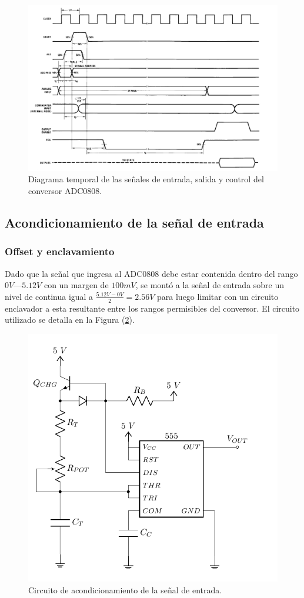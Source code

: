 \begin{figure}[H]
\centering
\includegraphics[width=0.9\linewidth]{ImagenesEjercicio1/ADC_TIMING.png}
\caption{Diagrama temporal de las señales de entrada, salida y control del conversor ADC0808.}
\label{ADC_TIMING}
\end{figure}

\subsection{Acondicionamiento de la señal de entrada}

\subsubsection{Offset y enclavamiento}

Dado que la señal que ingresa al ADC0808 debe estar contenida dentro del rango $0V$—$5.12V$ con un margen de $100mV$, se montó a la señal de entrada sobre un nivel de continua igual a $\frac{5.12V - 0V}{2} = 2.56V$ para luego limitar con un circuito enclavador a esta resultante entre los rangos permisibles del conversor. El circuito utilizado se detalla en la Figura (\ref{ACOND}).

\begin{figure}[H]
\centering
\includegraphics[width=0.6\linewidth, page = 3]{ImagenesEjercicio1/Components.pdf}
\caption{Circuito de acondicionamiento de la señal de entrada.}
\label{ACOND}
\end{figure}

